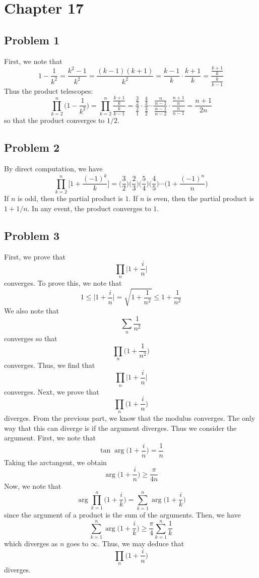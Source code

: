 \documentclass[12pt]{article}
\begin{document}
\section*{Chapter 17}
\subsection*{Problem 1}
First, we note that
\[
1-\frac{1}{k^2} = \frac{k^2 - 1}{k^2} = \frac{(k-1)(k+1)}{k^2} = \frac{k-1}{k} \cdot \frac{k+1}{k} = \frac{\frac{k+1}{k}}{\frac{k}{k-1}}
\] Thus the product telescopes:
\[
\prod_{k=2}^n \bigg(1 - \frac{1}{k^2}\bigg) = \prod_{k=2}^n \frac{\frac{k+1}{k}}{\frac{k}{k-1}} = \frac{\frac{3}{2}}{\frac{2}{1}}\cdot \frac{\frac{4}{3}}{\frac{3}{2}} \cdots \frac{\frac{n}{n-1}}{\frac{n-1}{n-2}} \cdot \frac{\frac{n+1}{n}}{\frac{n}{n-1}} = \frac{n+1}{2n}
\] so that the product converges to $1/2$.
\newpage
\subsection*{Problem 2}
By direct computation, we have
\[
\prod_{k=2}^n \bigg[1+ \frac{(-1)^k}{k}\bigg] = \bigg(\frac{3}{2}\bigg)\bigg(\frac{2}{3}\bigg)\bigg(\frac{5}{4}\bigg)\bigg(\frac{4}{5}\bigg)\cdots\bigg(1 + \frac{(-1)^n}{n}\bigg)
\] If $n$ is odd, then the partial product is $1$. If $n$ is even, then the partial product is $1+1/n$. In any event, the product converges to $1$.
\newpage
\subsection*{Problem 3}
First, we prove that 
\[
\prod_{n} \bigg \vert 1 + \frac{i}{n} \bigg \vert
\] converges. To prove this, we note that
\[
1 \leq \bigg \vert 1 + \frac{i}{n} \bigg \vert = \sqrt{1 + \frac{1}{n^2}} \leq 1 + \frac{1}{n^2}
\] We also note that 
\[
\sum_n \frac{1}{n^2}
\] converges so that
\[
\prod_n \bigg(1 + \frac{1}{n^2}\bigg) 
\] converges. Thus, we find that
\[
\prod_{n} \bigg \vert 1 + \frac{i}{n} \bigg \vert
\] converges. Next, we prove that
\[
\prod_n \bigg(1 + \frac{i}{n}\bigg)
\] diverges. From the previous part, we know that the modulus converges. The only way that this can diverge is if the argument diverges. Thus we consider the argument. First, we note that
\[
\tan \arg\bigg(1 + \frac{i}{n}\bigg) = \frac{1}{n}
\] Taking the arctangent, we obtain
\[
\arg\bigg(1 + \frac{i}{n}\bigg) \geq \frac{\pi}{4n}
\] Now, we note that
\[
\arg \prod_{k=1}^n \bigg(1 + \frac{i}{k}\bigg) = \sum_{k=1}^n \arg\bigg(1 + \frac{i}{k}\bigg)
\] since the argument of a product is the sum of the arguments. Then, we have
\[
\sum_{k=1}^n \arg\bigg(1 + \frac{i}{k}\bigg) \geq \frac{\pi}{4} \sum_{k=1}^n \frac{1}{k}
\] which diverges as $n$ goes to $\infty$. Thus, we may deduce that
\[
\prod_n \bigg(1 + \frac{i}{n}\bigg)
\] diverges.
\end{document}
